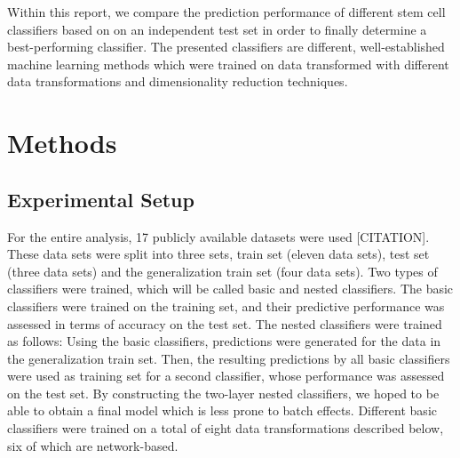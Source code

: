 \documentclass[10pt,conference,compsocconf]{IEEEtran}
\begin{document}
\par
Within this report, we compare the prediction performance of different stem cell classifiers based on on an independent test set in order to finally determine a best-performing classifier. The presented classifiers are different, well-established machine learning methods which were trained on data transformed with different data transformations and dimensionality reduction techniques. 

\section*{Methods}
\subsection{Experimental Setup}
For the entire analysis, 17 publicly available datasets were used [CITATION]. These data sets were split into three sets, train set (eleven data sets), test set (three data sets) and the generalization train set (four data sets). Two types of classifiers were trained, which will be called basic and nested classifiers. The basic classifiers were trained on the training set, and their predictive performance was assessed in terms of accuracy on the test set. The nested classifiers were trained as follows: Using the basic classifiers, predictions were generated for the data in the generalization train set. Then, the resulting predictions by all basic classifiers were used as training set for a second classifier, whose performance was assessed on the test set. By constructing the two-layer nested classifiers, we hoped to be able to obtain a final model which is less prone to batch effects. 
Different basic classifiers were trained on a total of eight data transformations described below, six of which are network-based. 
\end{document}
